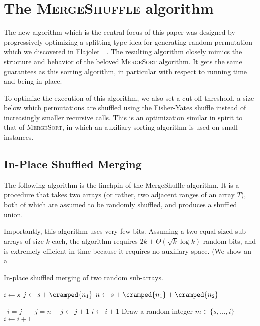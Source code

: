 \documentclass[letter,11pt,en]{quick-document}
\def\OneLineIf#1#2{\State\algorithmicif\ #1\ \algorithmicthen\ #2}
\begin{document}
\section{The \textsc{MergeShuffle} algorithm}

The new algorithm which is the central focus of this paper was designed by
progressively optimizing a splitting-type idea for generating random
permutation which we discovered in Flajolet~\etal~\cite{FlPeSo11}. The
resulting algorithm closely mimics the structure and behavior of the
beloved \textsc{MergeSort} algorithm. It gets the same guarantees as this
sorting algorithm, in particular with respect to running time and being in-place.

To optimize the execution of this algorithm, we also set a cut-off
threshold, a size below which permutations are shuffled using the
Fisher-Yates shuffle instead of increasingly smaller recursive calls. This
is an optimization similar in spirit to that of \textsc{MergeSort}, in
which an auxiliary sorting algorithm is used on small instances.

\subsection{In-Place Shuffled Merging}

The following algorithm is the linchpin of the MergeShuffle algorithm. It
is a procedure that takes two arrays (or rather, two adjacent ranges of an
array $T$), both of which are assumed to be randomly shuffled, and
produces a shuffled union.

Importantly, this algorithm uses very few bits. Assuming a two equal-sized
sub-arrays of size $k$ each, the algorithm requires
$2k + \Theta(\sqrt{k}\log k)$ random bits, and is extremely efficient in
time because it requires no auxiliary space. (We show an a

\begin{algorithm}
\caption{In-place shuffled merging of two random sub-arrays.}
\label{alg-flip-merge}
\begin{algorithmic}[1]
\State $i \gets s$
\State $j \gets s+\cramped{n_{1}}$
\State $n \gets s+\cramped{n_{1}}+\cramped{n_{2}}$
\Loop

    \OneLineIf{$i=j$}{\Break}
  \Else
    \OneLineIf{$j=n$}{\Break}
    \State {}
    \State $j \gets j + 1$
  \EndIf
  \State $i \gets i + 1$
\EndLoop
{}
  \State Draw a random integer $m \in \{s, \ldots, i\}$
  \State {}
  \State $i \gets i + 1$
\EndWhile
\EndProcedure
\end{algorithmic}
\end{algorithm}
\end{document}
